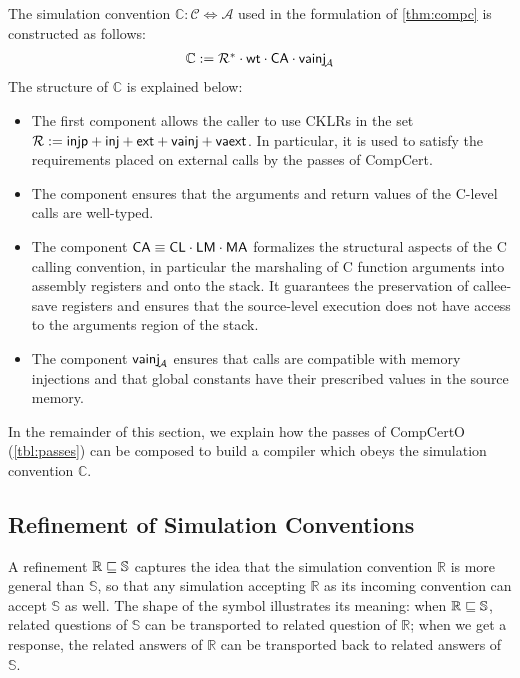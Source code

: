 \documentclass[sigplan,screen]{acmart}
\begin{document}

The simulation convention
$\mathbb{C} : \mathcal{C} \Leftrightarrow \mathcal{A}$
used in the formulation of \autoref{thm:compc}
is constructed as follows:
\[
  \begin{array}{c}
  \mathbb{C} :=
    \mathcal{R}^* \cdot
     \mathsf{wt}  \cdot
    { \ensuremath{ \mathsf{CA} } } \cdot
     \mathsf{vainj} _{\!\mathcal{A}}
  \end{array}
\]
The structure of $\mathbb{C}$
is explained below:
\begin{itemize}
\item
The first component
allows the caller to 
use CKLRs in the set
$
  \mathcal{R} :=  \mathsf{injp}  +  \mathsf{inj}  +  \mathsf{ext}  +  \mathsf{vainj}  +  \mathsf{vaext} 
$.
In particular,
it is used to satisfy the requirements
placed on external calls by the passes of CompCert.
\item
The component 
ensures that the arguments and return values of the C-level calls are well-typed.
\item
The component
${  \mathsf{CA}  } \equiv { \ensuremath{ \mathsf{CL} } } \cdot { \ensuremath{ \mathsf{LM} } } \cdot { \ensuremath{ \mathsf{MA} } }$
formalizes the structural aspects of
the C calling convention,
in particular
the marshaling of C function arguments
into assembly registers and onto the stack.
It guarantees the preservation of
callee-save registers
and ensures that the source-level execution
does not have access to the arguments region
of the stack.
\item
The component
$ \mathsf{vainj} _{\!\mathcal{A}}$
ensures that calls are compatible with memory injections
and that global constants have their prescribed values
in the source memory.
\end{itemize}

In the remainder of this section,
we explain how the passes of CompCertO
(\autoref{tbl:passes})
can be composed to build a compiler
which obeys the simulation convention $\mathbb{C}$.


\subsection{Refinement of Simulation Conventions} \label{sec:scref} %

A refinement $\mathbb{R} \sqsubseteq \mathbb{S}$
captures the idea that the simulation convention $\mathbb{R}$
is more general than $\mathbb{S}$,
so that any simulation accepting $\mathbb{R}$ as its
incoming convention can accept $\mathbb{S}$ as well.
The shape of the symbol illustrates its meaning:
when $\mathbb{R} \sqsubseteq \mathbb{S}$,
related questions of $\mathbb{S}$ can be transported to
related question of $\mathbb{R}$;
when we get a response, the
related answers of $\mathbb{R}$ can be transported back to
related answers of $\mathbb{S}$.
\end{document}
